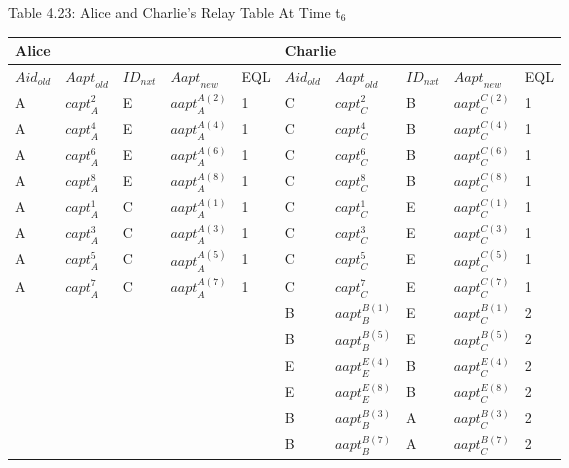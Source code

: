 Table 4.23: Alice and Charlie's Relay Table At Time t${}_{6}$

\begin{tabular}{|p{0.4in}|p{0.4in}|p{0.3in}|p{0.5in}|p{0.3in}|p{0.4in}|p{0.5in}|p{0.3in}|p{0.5in}|p{0.3in}|} \hline 
\multicolumn{5}{|p{1in}|}{Alice} & \multicolumn{5}{|p{1.9in}|}{Charlie} \\ \hline 
${Aid}_{old}$ & ${Aapt}_{old}$ & ${ID}_{nxt}$ & ${Aapt}_{new}$ & EQL & ${Aid}_{old}$ & ${Aapt}_{old}$ & ${ID}_{nxt}$ & ${Aapt}_{new}$ & EQL \\ \hline 
A & ${capt}^2_A$ & E & ${aapt}^{A\left(2\right)}_A$ & 1 & C & ${capt}^2_C$ & B & ${aapt}^{C\left(2\right)}_C$ & 1 \\ \hline 
A & ${capt}^4_A$ & E & ${aapt}^{A\left(4\right)}_A$ & 1 & C & ${capt}^4_C$ & B & ${aapt}^{C\left(4\right)}_C$ & 1 \\ \hline 
A & ${capt}^6_A$ & E & ${aapt}^{A\left(6\right)}_A$ & 1 & C & ${capt}^6_C$ & B & ${aapt}^{C\left(6\right)}_C$ & 1 \\ \hline 
A & ${capt}^8_A$ & E & ${aapt}^{A\left(8\right)}_A$ & 1 & C & ${capt}^8_C$ & B & ${aapt}^{C\left(8\right)}_C$ & 1 \\ \hline 
A & ${capt}^1_A$ & C & ${aapt}^{A\left(1\right)}_A$ & 1 & C & ${capt}^1_C$ & E & ${aapt}^{C\left(1\right)}_C$ & 1 \\ \hline 
A & ${capt}^3_A$ & C & ${aapt}^{A\left(3\right)}_A$ & 1 & C & ${capt}^3_C$ & E & ${aapt}^{C\left(3\right)}_C$ & 1 \\ \hline 
A & ${capt}^5_A$ & C & ${aapt}^{A\left(5\right)}_A$ & 1 & C & ${capt}^5_C$ & E & ${aapt}^{C\left(5\right)}_C$ & 1 \\ \hline 
A & ${capt}^7_A$ & C & ${aapt}^{A\left(7\right)}_A$ & 1 & C & ${capt}^7_C$ & E & ${aapt}^{C\left(7\right)}_C$ & 1 \\ \hline 
 &  &  &  &  & B & ${aapt}^{B\left(1\right)}_B$ & E & ${aapt}^{B\left(1\right)}_C$ & 2 \\ \hline 
 &  &  &  &  & B & ${aapt}^{B\left(5\right)}_B$ & E & ${aapt}^{B\left(5\right)}_C$ & 2 \\ \hline 
 &  &  &  &  & E & ${aapt}^{E\left(4\right)}_E$ & B & ${aapt}^{E\left(4\right)}_C$ & 2 \\ \hline 
 &  &  &  &  & E & ${aapt}^{E\left(8\right)}_E$ & B & ${aapt}^{E\left(8\right)}_C$ & 2 \\ \hline 
 &  &  &  &  & B & ${aapt}^{B\left(3\right)}_B$ & A & ${aapt}^{B\left(3\right)}_C$ & 2 \\ \hline 
 &  &  &  &  & B & ${aapt}^{B\left(7\right)}_B$ & A & ${aapt}^{B\left(7\right)}_C$ & 2 \\ \hline 
\end{tabular}

